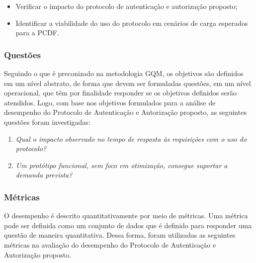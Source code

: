 \begin{itemize}
\item Verificar o impacto do protocolo de autenticação e autorização proposto;
\item Identificar a viabilidade do uso do protocolo em cen\'{a}rios de carga esperados para a PCDF.
\end{itemize}


\subsubsection{Questões}\label{sec:gqmquestoes}

Seguindo o que é preconizado na metodologia GQM, os objetivos são definidos em um nível abstrato, de forma que devem ser formuladas questões, em um nível operacional, que têm por finalidade responder se os objetivos definidos serão atendidos. Logo, com base nos objetivos formulados para a análise de desempenho do Protocolo de Autenticação e Autorização proposto, as seguintes questões foram investigadas:

\parbox{0.8\textwidth}{
\begin{enumerate}[(Q1)]
\item \emph{Qual o impacto observado no tempo de resposta às requisições com o uso do protocolo?}
\item \emph{Um protótipo funcional, sem foco em otimização, consegue suportar a demanda prevista?}
\end{enumerate}}

\subsubsection{Métricas}

O desempenho é descrito quantitativamente por meio de métricas. Uma métrica pode ser definida como um conjunto de dados que é definido para responder uma questão de maneira quantitativa. Dessa forma, foram utilizadas as seguintes métricas na avaliação do desempenho do Protocolo de Autenticação e Autorização proposto.

